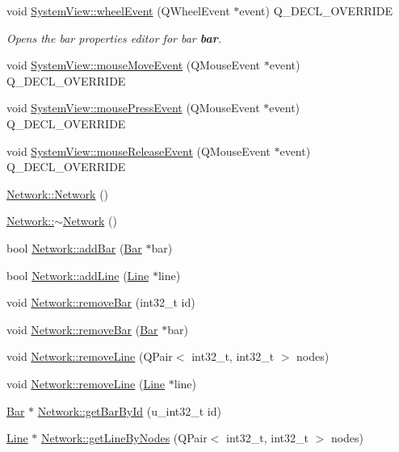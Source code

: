 \begin{DoxyCompactItemize}
void \hyperlink{group___graphics_gaab2fa6cebf9022eb6bf31497c0789675}{System\+View\+::wheel\+Event} (Q\+Wheel\+Event $\ast$event) Q\+\_\+\+D\+E\+C\+L\+\_\+\+O\+V\+E\+R\+R\+I\+D\+E
\begin{DoxyCompactList}\small\item\em Opens the bar properties editor for bar {\bfseries bar}. \end{DoxyCompactList}\item 
void \hyperlink{group___graphics_gab19e233cd697852dd71140971cb6e122}{System\+View\+::mouse\+Move\+Event} (Q\+Mouse\+Event $\ast$event) Q\+\_\+\+D\+E\+C\+L\+\_\+\+O\+V\+E\+R\+R\+I\+D\+E
\item 
void \hyperlink{group___graphics_ga42d4a485d6d9bd891d9505a5213cf783}{System\+View\+::mouse\+Press\+Event} (Q\+Mouse\+Event $\ast$event) Q\+\_\+\+D\+E\+C\+L\+\_\+\+O\+V\+E\+R\+R\+I\+D\+E
\item 
void \hyperlink{group___graphics_gaa8a2664405194bbe29daa454aead7416}{System\+View\+::mouse\+Release\+Event} (Q\+Mouse\+Event $\ast$event) Q\+\_\+\+D\+E\+C\+L\+\_\+\+O\+V\+E\+R\+R\+I\+D\+E
\item 
\hyperlink{group___graphics_ga3cc2fb4f8fa4d507077e8da85ce5a1c8}{Network\+::\+Network} ()
\item 
\hyperlink{group___graphics_ga7a4e19cdb4bf0c7ecf82baa643831492}{Network\+::$\sim$\+Network} ()
\item 
bool \hyperlink{group___graphics_ga8c5dfef0216731246f7411e1a5fbee01}{Network\+::add\+Bar} (\hyperlink{class_bar}{Bar} $\ast$bar)
\item 
bool \hyperlink{group___graphics_gae02945131494987b3ff9b59b627719b4}{Network\+::add\+Line} (\hyperlink{class_line}{Line} $\ast$line)
\item 
void \hyperlink{group___graphics_ga997ce4f03d316b9f138f2e64e6ca400c}{Network\+::remove\+Bar} (int32\+\_\+t id)
\item 
void \hyperlink{group___graphics_ga7dea7690987c58fa61ffaa0326b68b68}{Network\+::remove\+Bar} (\hyperlink{class_bar}{Bar} $\ast$bar)
\item 
void \hyperlink{group___graphics_ga1eef3317224a7a06348fce07e581a9ad}{Network\+::remove\+Line} (Q\+Pair$<$ int32\+\_\+t, int32\+\_\+t $>$ nodes)
\item 
void \hyperlink{group___graphics_ga4fd51288aa75614593977ce8aab9100f}{Network\+::remove\+Line} (\hyperlink{class_line}{Line} $\ast$line)
\item 
\hyperlink{class_bar}{Bar} $\ast$ \hyperlink{group___graphics_ga9c5806f5a0d236bb6d8abbdce62d9675}{Network\+::get\+Bar\+By\+Id} (u\+\_\+int32\+\_\+t id)
\item 
\hyperlink{class_line}{Line} $\ast$ \hyperlink{group___graphics_ga8f090b85a7779695cb9f05b6395b3044}{Network\+::get\+Line\+By\+Nodes} (Q\+Pair$<$ int32\+\_\+t, int32\+\_\+t $>$ nodes)
\end{DoxyCompactItemize}
